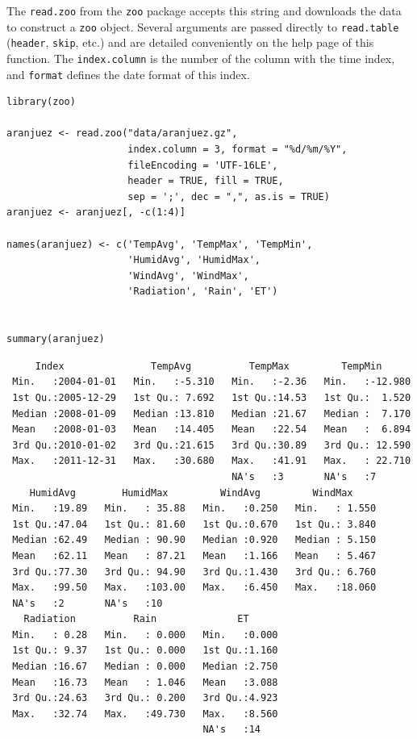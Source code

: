 The \texttt{read.zoo} from the \texttt{zoo} package accepts this string and
downloads the data to construct a \texttt{zoo} object. Several
arguments are passed directly to \texttt{read.table} (\texttt{header}, \texttt{skip},
etc.) and are detailed conveniently on the help page of this
function. The \texttt{index.column} is the number of the column with the
time index, and \texttt{format} defines the date format of this index.


\lstset{language=r,label= ,caption= ,captionpos=b,numbers=none}
\begin{lstlisting}
library(zoo)
  
aranjuez <- read.zoo("data/aranjuez.gz",
                     index.column = 3, format = "%d/%m/%Y",
                     fileEncoding = 'UTF-16LE',
                     header = TRUE, fill = TRUE,
                     sep = ';', dec = ",", as.is = TRUE)
aranjuez <- aranjuez[, -c(1:4)]
  
names(aranjuez) <- c('TempAvg', 'TempMax', 'TempMin',
                     'HumidAvg', 'HumidMax',
                     'WindAvg', 'WindMax',
                     'Radiation', 'Rain', 'ET')
  
  
summary(aranjuez)
\end{lstlisting}

\begin{verbatim}
     Index               TempAvg          TempMax         TempMin       
 Min.   :2004-01-01   Min.   :-5.310   Min.   :-2.36   Min.   :-12.980  
 1st Qu.:2005-12-29   1st Qu.: 7.692   1st Qu.:14.53   1st Qu.:  1.520  
 Median :2008-01-09   Median :13.810   Median :21.67   Median :  7.170  
 Mean   :2008-01-03   Mean   :14.405   Mean   :22.54   Mean   :  6.894  
 3rd Qu.:2010-01-02   3rd Qu.:21.615   3rd Qu.:30.89   3rd Qu.: 12.590  
 Max.   :2011-12-31   Max.   :30.680   Max.   :41.91   Max.   : 22.710  
                                       NA's   :3       NA's   :7        
    HumidAvg        HumidMax         WindAvg         WindMax      
 Min.   :19.89   Min.   : 35.88   Min.   :0.250   Min.   : 1.550  
 1st Qu.:47.04   1st Qu.: 81.60   1st Qu.:0.670   1st Qu.: 3.840  
 Median :62.49   Median : 90.90   Median :0.920   Median : 5.150  
 Mean   :62.11   Mean   : 87.21   Mean   :1.166   Mean   : 5.467  
 3rd Qu.:77.30   3rd Qu.: 94.90   3rd Qu.:1.430   3rd Qu.: 6.760  
 Max.   :99.50   Max.   :103.00   Max.   :6.450   Max.   :18.060  
 NA's   :2       NA's   :10                                       
   Radiation          Rain              ET       
 Min.   : 0.28   Min.   : 0.000   Min.   :0.000  
 1st Qu.: 9.37   1st Qu.: 0.000   1st Qu.:1.160  
 Median :16.67   Median : 0.000   Median :2.750  
 Mean   :16.73   Mean   : 1.046   Mean   :3.088  
 3rd Qu.:24.63   3rd Qu.: 0.200   3rd Qu.:4.923  
 Max.   :32.74   Max.   :49.730   Max.   :8.560  
                                  NA's   :14
\end{verbatim}

